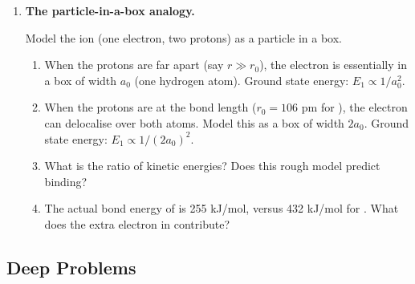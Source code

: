 \documentclass[12pt, a4paper]{book}
\begin{document}
\begin{problembox}
\begin{enumerate}[label=\textbf{\arabic*.}]
  \item \textbf{The particle-in-a-box analogy.}

        Model the  ion (one electron, two protons)
        as a particle in a box.
        \begin{enumerate}[label=(\alph*)]
          \item When the protons are far apart (say $r \gg r_0$),
                the electron is essentially in a box of
                width $a_0$ (one hydrogen atom).
                Ground state energy: $E_1 \propto 1/a_0^2$.
          \item When the protons are at the bond length
                ($r_0 = 106$ pm for ), the electron
                can delocalise over both atoms.
                Model this as a box of width $2a_0$.
                Ground state energy: $E_1 \propto 1/(2a_0)^2$.
          \item What is the ratio of kinetic energies?
                Does this rough model predict binding?
          \item The actual bond energy of  is
                255 kJ/mol, versus 432 kJ/mol for .
                What does the extra electron in 
                contribute?
        \end{enumerate}
\end{enumerate}
\end{problembox}

\subsection*{Deep Problems}
\end{document}

